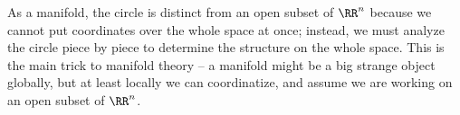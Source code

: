 

As a manifold, the circle is distinct from an open subset of $\RR^n$ because we cannot put coordinates over the whole space at once; instead, we must analyze the circle piece by piece to determine the structure on the whole space. This is the main trick to manifold theory -- a manifold might be a big strange object globally, but at least locally we can coordinatize, and assume we are working on an open subset of $\RR^n$.

